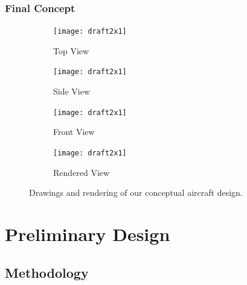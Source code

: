 \documentclass[report]{byu-aero}
\begin{document}
\lipsum[1]


\subsubsection{Final Concept}
\label{sssec:finalconcept}

\lipsum[1]

\begin{figure}[h!]
	\centering
	\begin{subfigure}[b]{0.475\textwidth}
		\texttt{[image: draft2x1]}
		\caption{Top View}
		\label{fig:topview}
	\end{subfigure}
	\begin{subfigure}[b]{0.475\textwidth}
		\texttt{[image: draft2x1]}
		\caption{Side View}
		\label{fig:sideview}
	\end{subfigure}
	
	\begin{subfigure}[b]{0.475\textwidth}
		\texttt{[image: draft2x1]}
		\caption{Front View}
		\label{fig:frontview}
	\end{subfigure}
	\begin{subfigure}[b]{0.475\textwidth}
		\texttt{[image: draft2x1]}
		\caption{Rendered View}
		\label{fig:renderedview}
	\end{subfigure}
	\caption{Drawings and rendering of our conceptual aircraft design.}
	\label{fig:prelimdrawings}
\end{figure}



\section{Preliminary Design} %
\label{sec:PreliminaryDesign}


\subsection{Methodology}
\label{ssec:methodology}
\end{document}
